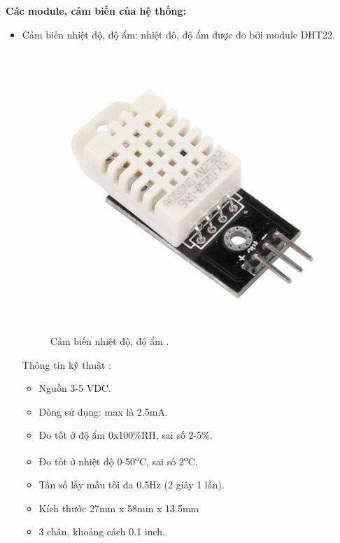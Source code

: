 \documentclass[a4paper,12pt,oneside]{article}
\begin{document}
\noindent \textbf{Các module, cảm biến của hệ thống:}
\begin{itemize}

\item Cảm biến nhiệt độ, độ ẩm: nhiệt đô, độ ẩm được đo bởi module DHT22.

\begin{figure}[H]
	\centering
	\includegraphics[scale=.3]{hinh/DHT22.jpg}
	\caption{Cảm biến nhiệt độ, độ ẩm \cite{dht22}.}
	\label{fig:DHT22}
\end{figure}


\noindent Thông tin kỹ thuật \cite{dht22}:
\begin{itemize}
\item Nguồn 3-5 VDC.
\item Dòng sử dụng: max là 2.5mA.
\item Đo tốt ở độ ẩm 0x100\%RH, sai số 2-5\%.
\item Đo tốt ở nhiệt độ 0-50\textsuperscript{o}C, sai số 2\textsuperscript{o}C.
\item Tần số lấy mẫu tối đa 0.5Hz (2 giây 1 lần).
\item Kích thước 27mm x 58mm x 13.5mm
\item 3 chân, khoảng cách 0.1 inch.
\end{itemize}


\end{itemize}
\end{document}

